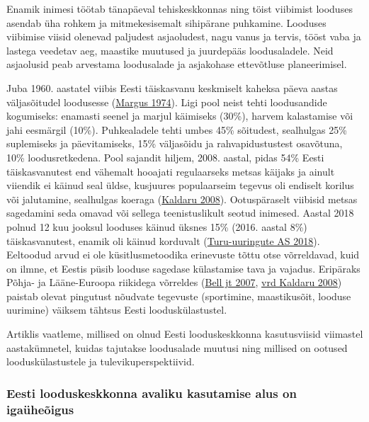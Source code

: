 \documentclass[estonian,]{article}
\begin{document}
Enamik inimesi töötab tänapäeval tehiskeskkonnas ning töist viibimist looduses asendab üha rohkem ja mitmekesisemalt sihipärane puhkamine. Looduses viibimise viisid olenevad paljudest asjaoludest, nagu vanus ja tervis, tööst vaba ja lastega veedetav aeg, maastike muutused ja juurdepääs loodusaladele. Neid asjaolusid peab arvestama loodusalade ja asjakohase ettevõtluse planeerimisel.

Juba 1960. aastatel viibis Eesti täiskasvanu keskmiselt kaheksa päeva aastas väljasõitudel loodusesse (\protect\hyperlink{Margus1974}{Margus 1974}). Ligi pool neist tehti loodusandide kogumiseks: enamasti seenel ja marjul käimiseks (30\%), harvem kalastamise või jahi eesmärgil (10\%). Puhkealadele tehti umbes 45\% sõitudest, sealhulgas 25\% suplemiseks ja päevitamiseks, 15\% väljasõidu ja rahvapidustustest osavõtuna, 10\% loodusretkedena. Pool sajandit hiljem, 2008. aastal, pidas 54\% Eesti täiskasvanutest end vähemalt hooajati regulaarseks metsas käijaks ja ainult viiendik ei käinud seal üldse, kusjuures populaarseim tegevus oli endiselt korilus või jalutamine, sealhulgas koeraga (\protect\hyperlink{Kaldaru2008}{Kaldaru 2008}). Ootuspäraselt viibisid metsas sagedamini seda omavad või sellega teenistuslikult seotud inimesed. Aastal 2018 polnud 12 kuu jooksul looduses käinud üksnes 15\% (2016. aastal 8\%) täiskasvanutest, enamik oli käinud korduvalt (\protect\hyperlink{Turu-uuringute2018}{Turu-uuringute AS 2018}). Eeltoodud arvud ei ole küsitlusmetoodika erinevuste tõttu otse võrreldavad, kuid on ilmne, et Eestis püsib looduse sagedase külastamise tava ja vajadus. Eripäraks Põhja- ja Lääne-Euroopa riikidega võrreldes (\protect\hyperlink{Bell2007}{Bell jt 2007}, \protect\hyperlink{Kaldaru2008}{vrd Kaldaru 2008}) paistab olevat pingutust nõudvate tegevuste (sportimine, maastikusõit, looduse uurimine) väiksem tähtsus Eesti looduskülastustel.

Artiklis vaatleme, millised on olnud Eesti looduskeskkonna kasutusviisid viimastel aastakümnetel, kuidas tajutakse loodusalade muutusi ning millised on ootused looduskülastustele ja tulevikuperspektiivid.

\hypertarget{eesti-looduskeskkonna-avaliku-kasutamise-alus-on-igauxfcheuxf5igus}{%
\subsubsection*{Eesti looduskeskkonna avaliku kasutamise alus on igaüheõigus}\label{eesti-looduskeskkonna-avaliku-kasutamise-alus-on-igauxfcheuxf5igus}}
\end{document}
